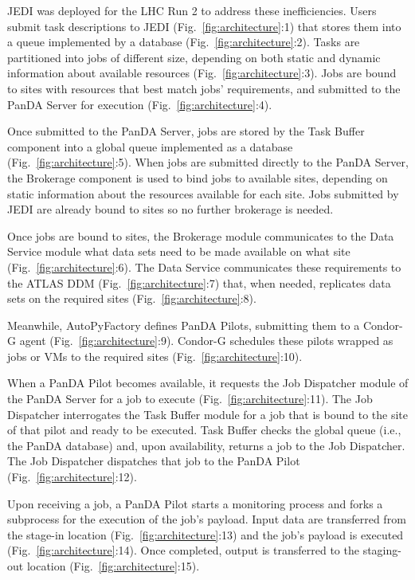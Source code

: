 JEDI was deployed for the LHC Run 2 to address these inefficiencies. Users
submit task descriptions to JEDI (Fig.~\ref{fig:architecture}:1) that stores
them into a queue implemented by a database (Fig.~\ref{fig:architecture}:2).
Tasks are partitioned into jobs of different size, depending on both static and
dynamic information about available resources (Fig.~\ref{fig:architecture}:3).
Jobs are bound to sites with resources that best match jobs' requirements, and
submitted to the PanDA Server for execution (Fig.~\ref{fig:architecture}:4).

Once submitted to the PanDA Server, jobs are stored by the Task Buffer component
into a global queue implemented as a database (Fig.~\ref{fig:architecture}:5).
When jobs are submitted directly to the PanDA Server, the Brokerage component is
used to bind jobs to available sites, depending on static information about the
resources available for each site. Jobs submitted by JEDI are already bound to
sites so no further brokerage is needed.

Once jobs are bound to sites, the Brokerage module communicates to the Data
Service module what data sets need to be made available on what site
(Fig.~\ref{fig:architecture}:6). The Data Service communicates these
requirements to the ATLAS DDM (Fig.~\ref{fig:architecture}:7) that, when needed,
replicates data sets on the required sites (Fig.~\ref{fig:architecture}:8).

Meanwhile, AutoPyFactory defines PanDA Pilots, submitting them to a Condor-G
agent (Fig.~\ref{fig:architecture}:9). Condor-G schedules these pilots wrapped
as jobs or VMs to the required sites (Fig.~\ref{fig:architecture}:10).

When a PanDA Pilot becomes available, it requests the Job Dispatcher module of
the PanDA Server for a job to execute (Fig.~\ref{fig:architecture}:11). The Job
Dispatcher interrogates the Task Buffer module for a job that is bound to the
site of that pilot and ready to be executed. Task Buffer checks the global queue
(i.e., the PanDA database) and, upon availability, returns a job to the Job
Dispatcher. The Job Dispatcher dispatches that job to the PanDA Pilot
(Fig.~\ref{fig:architecture}:12).

Upon receiving a job, a PanDA Pilot starts a monitoring process and forks a
subprocess for the execution of the job's payload. Input data are transferred
from the stage-in location (Fig.~\ref{fig:architecture}:13) and the job's
payload is executed (Fig.~\ref{fig:architecture}:14). Once completed, output is
transferred to the staging-out location (Fig.~\ref{fig:architecture}:15).

